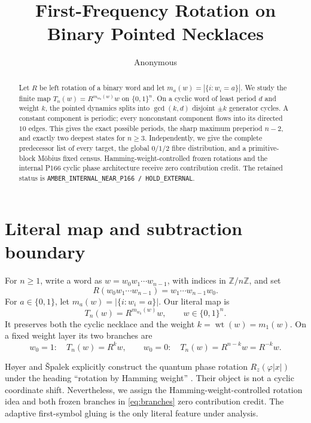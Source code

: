 \documentclass[a4paper,10pt]{amsart}
\title[First-frequency rotation]{First-Frequency Rotation on Binary Pointed Necklaces}
\author{Anonymous}
\date{}
\theoremstyle{remark}
\newcommand{\Z}{\mathbb Z}
\newcommand{\F}{\{0,1\}}
\newcommand{\wt}{\operatorname{wt}}
\newcommand{\1}{\mathbf 1}
\begin{document}
\begin{abstract}
Let $R$ be left rotation of a binary word and let
$m_a(w)=|\{i:w_i=a\}|$.  We study the finite map
$T_n(w)=R^{m_{w_0}(w)}w$ on $\{0,1\}^n$.  On a cyclic word of least
period $d$ and weight $k$, the pointed dynamics splits into
$\gcd(k,d)$ disjoint $\mathord{\pm}k$ generator cycles.  A constant
component is periodic; every nonconstant component flows into its directed
$10$ edges.  This gives the exact possible periods, the sharp maximum
preperiod $n-2$, and exactly two deepest states for $n\geq3$.  Independently,
we give the complete predecessor list of every target, the global
$0/1/2$ fibre distribution, and a primitive-block M\"obius fixed census.
Hamming-weight-controlled frozen rotations and the internal P166 cyclic
phase architecture receive zero contribution credit.  The retained status
is \texttt{AMBER\_INTERNAL\_NEAR\_P166 / HOLD\_EXTERNAL}.
\end{abstract}

\maketitle

\section{Literal map and subtraction boundary}

For $n\geq1$, write a word as $w=w_0w_1\cdots w_{n-1}$, with indices in
$\Z/n\Z$, and set
\[
 R(w_0w_1\cdots w_{n-1})=w_1\cdots w_{n-1}w_0.
\]
For $a\in\F$, let $m_a(w)=|\{i:w_i=a\}|$.  Our literal map is
\begin{equation}\label{eq:literal}
 T_n(w)=R^{m_{w_0}(w)}w,\qquad w\in\F^n.
\end{equation}
It preserves both the cyclic necklace and the weight $k=\wt(w)=m_1(w)$.
On a fixed weight layer its two branches are
\begin{equation}\label{eq:branches}
 w_0=1:\quad T_n(w)=R^k w,
 \qquad
 w_0=0:\quad T_n(w)=R^{n-k}w=R^{-k}w.
\end{equation}

H\o yer and \v Spalek explicitly construct the quantum phase rotation
$R_z(\varphi|x|)$ under the heading ``rotation by Hamming weight''
\cite[Sec.~3.2]{HoyerSpalek2005}.  Their object is not a cyclic coordinate
shift.  Nevertheless, we assign the Hamming-weight-controlled rotation
idea and both frozen branches in \eqref{eq:branches} zero contribution
credit.  The adaptive first-symbol gluing is the only literal feature under
analysis.
\end{document}
